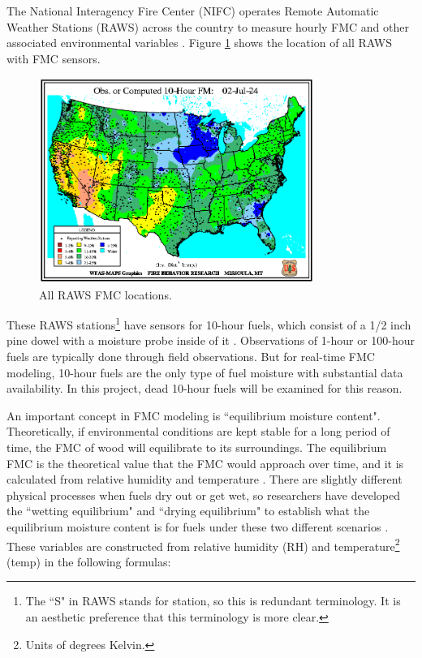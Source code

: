 \documentclass[11pt]{article}%
\begin{document}
The National Interagency Fire Center (NIFC) operates Remote Automatic Weather Stations (RAWS) across the country to measure hourly FMC and other associated environmental variables \cite{NIFC-2024-RAW}. Figure \ref{fig:wfas_raws} shows the location of all RAWS with FMC sensors.

\begin{figure}[ht]
    \centering
    \includegraphics[width=0.8\textwidth]{images/WFAS-RAWS-map.png}
    \caption{All RAWS FMC locations.}
    \label{fig:wfas_raws}
\end{figure}

These RAWS stations\footnote{The ``S" in RAWS stands for station, so this is redundant terminology. It is an aesthetic preference that this terminology is more clear.} have sensors for 10-hour fuels, which consist of a 1/2 inch pine dowel with a moisture probe inside of it \cite{Campbell-2017-RMM}. Observations of 1-hour or 100-hour fuels are typically done through field observations. But for real-time FMC modeling, 10-hour fuels are the only type of fuel moisture with substantial data availability. In this project, dead 10-hour fuels will be examined for this reason.

An important concept in FMC modeling is ``equilibrium moisture content". Theoretically, if environmental conditions are kept stable for a long period of time, the FMC of wood will equilibrate to its surroundings. The equilibrium FMC is the theoretical value that the FMC would approach over time, and it is calculated from relative humidity and temperature \cite{Mitchell-2018-CEM}. There are slightly different physical processes when fuels dry out or get wet, so researchers have developed the ``wetting equilibrium" and ``drying equilibrium" to establish what the equilibrium moisture content is for fuels under these two different scenarios \cite{Mandel-2014-RAA}. These variables are constructed from relative humidity (RH) and temperature\footnote{Units of degrees Kelvin.} (temp) in the following formulas:
\end{document}
